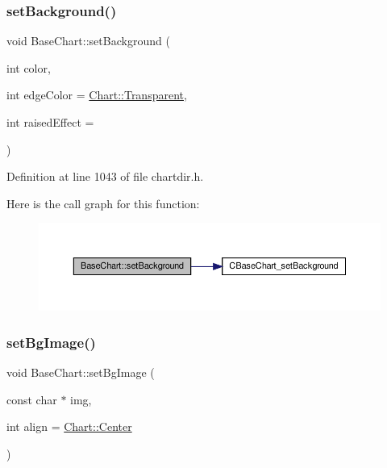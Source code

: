 \subsubsection{\texorpdfstring{set\+Background()}{setBackground()}}
{\footnotesize\ttfamily void Base\+Chart\+::set\+Background (\begin{DoxyParamCaption}\item[{int}]{color,  }\item[{int}]{edge\+Color = {\ttfamily \hyperlink{namespace_chart_abee0d882fdc9ad0b001245ad9fc64011afc6811800a9e2582dac0157b6279f836}{Chart\+::\+Transparent}},  }\item[{int}]{raised\+Effect = {} }\end{DoxyParamCaption})\hspace{0.3cm}{\ttfamily [inline]}}



Definition at line 1043 of file chartdir.\+h.

Here is the call graph for this function\+:
\nopagebreak
\begin{figure}[H]
\begin{center}
\leavevmode
\includegraphics[width=350pt]{class_base_chart_ace729351109290982bc624323698cd6e_cgraph}
\end{center}
\end{figure}
\mbox{\label{class_base_chart_a0e8bd2475ae0d998d5936ebeb307c5e1}} 
\subsubsection{\texorpdfstring{set\+Bg\+Image()}{setBgImage()}}
{\footnotesize\ttfamily void Base\+Chart\+::set\+Bg\+Image (\begin{DoxyParamCaption}\item[{const char $\ast$}]{img,  }\item[{int}]{align = {\ttfamily \hyperlink{namespace_chart_ae222e51ce11a254450b6ddfbc862680aab21c196681da027efd151236305b985d}{Chart\+::\+Center}} }\end{DoxyParamCaption})\hspace{0.3cm}{\ttfamily [inline]}}



